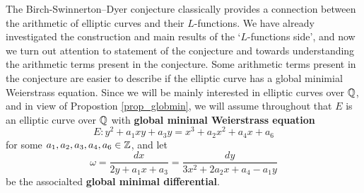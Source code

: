 The Birch-Swinnerton--Dyer conjecture classically provides a connection between the arithmetic of elliptic curves and their $L$-functions. We have already investigated the construction and main results of the `$L$-functions side', and now we turn out attention to statement of the conjecture and towards understanding the arithmetic terms present in the conjecture. Some arithmetic terms present in the conjecture are easier to describe if the elliptic curve has a global minimial Weierstrass equation. Since we will be mainly interested in elliptic curves over $\mathbb{Q}$, and in view of Propostion \ref*{prop_globmin}, we will assume throughout that $E$ is an elliptic curve over $\mathbb{Q}$ with \textbf{global minimal Weierstrass equation}
$$E:y^2+a_1xy+a_3y=x^3+a_2x^2+a_4x+a_6$$ 
for some $a_1,a_2,a_3,a_4,a_6\in\mathbb{Z}$, and let 
$$\omega=\frac{dx}{2y+a_1x+a_3}=\frac{dy}{3x^2+2a_2x+a_4-a_1y}$$
be the associalted \textbf{global minimal differential}.



%

